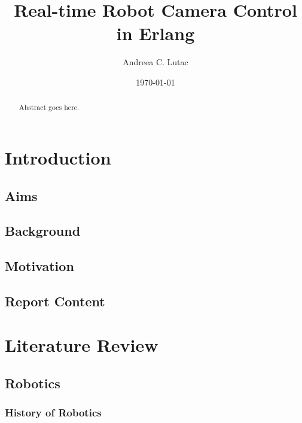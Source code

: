 \documentclass{l4proj}
\begin{document}
\title{Real-time Robot Camera Control in Erlang}
\author{Andreea C. Lutac}
\date{\today}
\maketitle

\begin{abstract}
Abstract goes here.
\end{abstract}

\educationalconsent
%
%
\tableofcontents
\chapter{Introduction}
\label{intro}

\section{Aims}


\section{Background}


\section{Motivation}


\section{Report Content}


\chapter{Literature Review}

\section{Robotics}

\subsection{History of Robotics}
\end{document}
